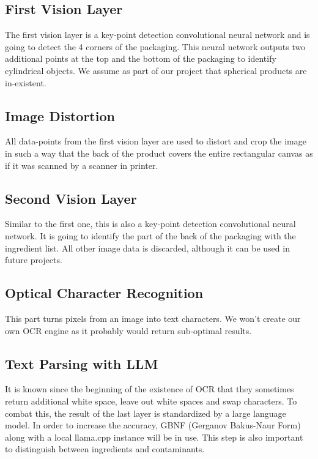 \documentclass[a4paper,11pt]{report}
\begin{document}
            \subsection{First Vision Layer}
                The first vision layer is a key-point detection convolutional neural network and is going to detect the 4 corners of the packaging. This neural network outputs two additional points at the top and the bottom of the packaging to identify cylindrical objects. We assume as part of our project that spherical products are in-existent.

            \subsection{Image Distortion}
                \label{subsec:architecture:distortion}
                All data-points from the first vision layer are used to distort and crop the image in such a way that the back of the product covers the entire rectangular canvas as if it was scanned by a scanner in printer.

            \subsection{Second Vision Layer}
                Similar to the first one, this is also a key-point detection convolutional neural network.
                It is going to identify the part of the back of the packaging with the ingredient list. All other image data is discarded, although it can be used in future projects.

            \subsection{Optical Character Recognition}
                This part turns pixels from an image into text characters. We won't create our own OCR engine as it probably would return sub-optimal results.

            \subsection{Text Parsing with LLM}
                It is known since the beginning of the existence of OCR that they sometimes return additional white space, leave out white spaces and swap characters. To combat this, the result of the last layer is standardized by a large language model. In order to increase the accuracy, GBNF (Gerganov Bakus-Naur Form) \cite{gbnf} along with a local llama.cpp \cite{llamacpp} instance will be in use. This step is also important to distinguish between ingredients and contaminants.
\end{document}
